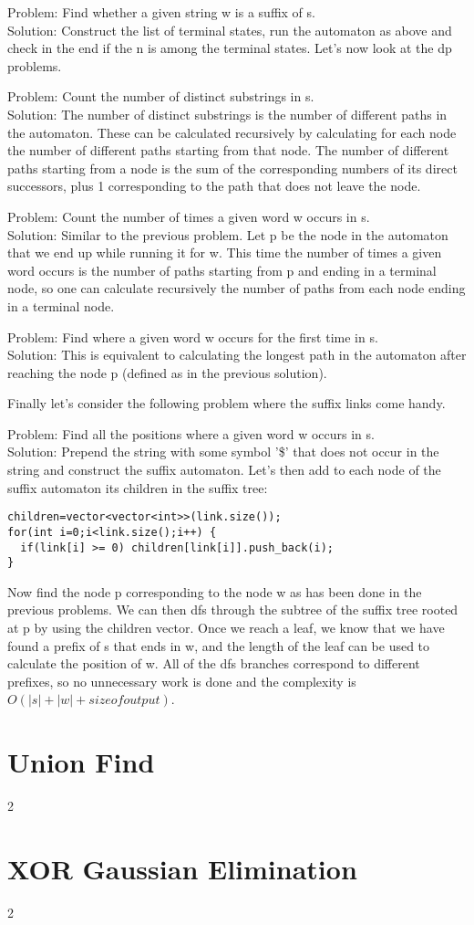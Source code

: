 \documentclass[a4paper,13pt]{article}
\newcommand\includefile[3]{
   \section{#1}
   \begin{multicols}{2}
    
   \end{multicols}
}
\begin{document}
Problem: Find whether a given string w is a suffix of s.\\
Solution: Construct the list of terminal states, run the automaton as above and check in the end if the n is among the terminal states.
Let's now look at the dp problems.

Problem: Count the number of distinct substrings in s.\\
Solution: The number of distinct substrings is the number of different paths in the automaton. These can be calculated recursively by calculating for each node the number of different paths starting from that node. The number of different paths starting from a node is the sum of the corresponding numbers of its direct successors, plus 1 corresponding to the path that does not leave the node.

Problem: Count the number of times a given word w occurs in s.\\
Solution: Similar to the previous problem. Let p be the node in the automaton that we end up while running it for w. This time the number of times a given word occurs is the number of paths starting from p and ending in a terminal node, so one can calculate recursively the number of paths from each node ending in a terminal node.

Problem: Find where a given word w occurs for the first time in s.\\
Solution: This is equivalent to calculating the longest path in the automaton after reaching the node p (defined as in the previous solution).

Finally let's consider the following problem where the suffix links come handy.

Problem: Find all the positions where a given word w occurs in s.\\
Solution: Prepend the string with some symbol '\$' that does not occur in the string and construct the suffix automaton. Let's then add to each node of the suffix automaton its children in the suffix tree:

\begin{verbatim}
children=vector<vector<int>>(link.size());
for(int i=0;i<link.size();i++) {
  if(link[i] >= 0) children[link[i]].push_back(i);
}
\end{verbatim}

Now find the node p corresponding to the node w as has been done in the previous problems. We can then dfs through the subtree of the suffix tree rooted at p by using the children vector. Once we reach a leaf, we know that we have found a prefix of s that ends in w, and the length of the leaf can be used to calculate the position of w. All of the dfs branches correspond to different prefixes, so no unnecessary work is done and the complexity is $O(|s| + |w| + size of output)$.

\includefile{Union Find}{../lib}{union_find.cpp}
\includefile{XOR Gaussian Elimination}{../lib}{gaussian_elimination_xor.cpp}
\end{document}
